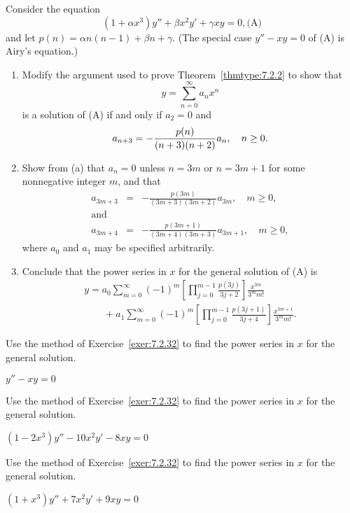 \documentclass{ximera}
\begin{document}
\begin{problem}\label{exer:7.2.32}
Consider the equation
$$
\left(1+\alpha x^3\right)y''+\beta x^2y'+\gamma xy=0,
\text{(A)}
$$
and let
$p(n)=\alpha n(n-1)+\beta n+\gamma$.
(The special case $y''-xy=0$ of (A) is
 Airy's equation.)

\begin{enumerate}
\item %
 Modify the argument used to prove Theorem~\ref{thmtype:7.2.2}
to show that
$$
y=\sum_{n=0}^\infty a_nx^n
$$
  is a solution of
(A) if and only if  $a_2=0$  and
$$
a_{n+3}=-{p(n)\over(n+3)(n+2)}a_n,\quad n\ge0.
$$
\item %
Show from (a)  that $a_n=0$  unless $n=3m$  or $n=3m+1$
for some nonnegative integer $m$, and that
\begin{eqnarray*}
a_{3m+3}&=&-\frac{p(3m)}{(3m+3)(3m+2)}a_{3m},\quad m\ge
0,\\
\mbox{and}\\
a_{3m+4}&=&-\frac{p(3m+1)}{(3m+4)(3m+3)}
a_{3m+1},\quad m\ge0,
\end{eqnarray*}
where $a_0$ and $a_1$ may be specified arbitrarily.
\item %
Conclude that the  power series in $x$ for the general
solution
of (A)  is
$$
\begin{array}{l}
y=a_0\sum^\infty_{m=0}(-1)^m \left[\prod^{m-1}_{j=0}
\frac{p(3j)}{3j+2}\right] \frac{x^{3m}}{3^m m!}\\
\qquad+a_1\sum^\infty_{m=0}(-1)^m
\left[\prod^{m-1}_{j=0}\frac{p(3j+1)}{3j+4}\right]
\frac{x^{3m+1}}{3^mm!}.
\end{array}
$$
\end{enumerate}
\end{problem}

\begin{problem}\label{exer:7.2.33}
Use the method of
Exercise~\ref{exer:7.2.32}  to find the power series in
$x$ for the general solution.

$y''-xy=0$
\end{problem}

\begin{problem}\label{exer:7.2.34}
Use the method of
Exercise~\ref{exer:7.2.32}  to find the power series in
$x$ for the general solution.

$(1-2x^3)y''-10x^2y'-8xy=0$
\end{problem}

\begin{problem}\label{exer:7.2.35}
Use the method of
Exercise~\ref{exer:7.2.32}  to find the power series in
$x$ for the general solution.

$(1+x^3)y''+7x^2y'+9xy=0$
\end{problem}
\end{document}
